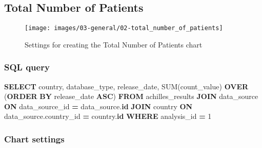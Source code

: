 \documentclass[
]{book}
\newenvironment{Shaded}{\begin{snugshade}}{\end{snugshade}}
\newcommand{\DecValTok}[1]{\textcolor[rgb]{0.00,0.00,0.81}{#1}}
\newcommand{\FunctionTok}[1]{\textcolor[rgb]{0.00,0.00,0.00}{#1}}
\newcommand{\KeywordTok}[1]{\textcolor[rgb]{0.13,0.29,0.53}{\textbf{#1}}}
\newcommand{\NormalTok}[1]{#1}
\newcommand{\OperatorTok}[1]{\textcolor[rgb]{0.81,0.36,0.00}{\textbf{#1}}}
\begin{document}
\hypertarget{total-number-of-patients}{%
\subsection*{Total Number of Patients}\label{total-number-of-patients}}

\begin{figure}
\texttt{[image: images/03-general/02-total\_number\_of\_patients]} \caption{Settings for creating the Total Number of Patients chart}\label{fig:totalNumberOfPatients}
\end{figure}

\hypertarget{sql-query-9}{%
\subsubsection*{SQL query}\label{sql-query-9}}

\begin{Shaded}
\begin{Highlighting}[]
\KeywordTok{SELECT}
\NormalTok{ country,}
\NormalTok{ database\_type,}
\NormalTok{ release\_date,}
 \FunctionTok{SUM}\NormalTok{(count\_value) }\KeywordTok{OVER}\NormalTok{ (}\KeywordTok{ORDER} \KeywordTok{BY}\NormalTok{ release\_date }\KeywordTok{ASC}\NormalTok{)}
\KeywordTok{FROM}\NormalTok{ achilles\_results}
\KeywordTok{JOIN}\NormalTok{ data\_source }\KeywordTok{ON}\NormalTok{ data\_source\_id }\OperatorTok{=}\NormalTok{ data\_source.}\KeywordTok{id}
\KeywordTok{JOIN}\NormalTok{ country }\KeywordTok{ON}\NormalTok{ data\_source.country\_id }\OperatorTok{=}\NormalTok{ country.}\KeywordTok{id}
\KeywordTok{WHERE}\NormalTok{ analysis\_id }\OperatorTok{=} \DecValTok{1}
\end{Highlighting}
\end{Shaded}

\hypertarget{chart-settings-10}{%
\subsubsection*{Chart settings}\label{chart-settings-10}}
\end{document}
